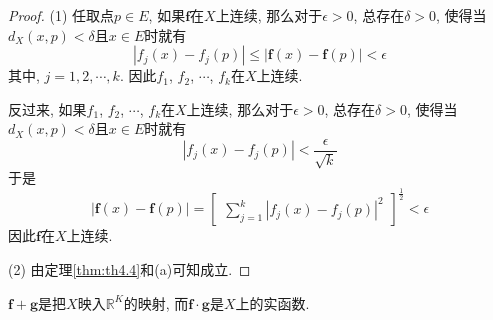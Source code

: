 \documentclass[cn,12pt,math=mtpro2,citestyle=gb7714-2015,bibstyle=gb7714-2015,twocol]{elegantbook}
\newcommand{\R}{\mathbb{R}}
\newcommand{\f}{\mathbold{f}}
\newcommand{\g}{\mathbold{g}}
\begin{document}
\begin{proof}
  (1) 任取点$p\in E$, 如果$\f $在$X$上连续, 那么对于$\epsilon>0$, 总存在$\delta>0$, 使得当$d_X(x,p)<\delta$且$x\in E$时就有
  $$|f_j(x)-f_j(p)|\leq|\f (x)-\f (p)|<\epsilon$$
  其中, $j=1,2,\cdots,k$. 因此$f_1$, $f_2$, $\cdots$, $f_k$在$X$上连续.

  反过来, 如果$f_1$, $f_2$, $\cdots$, $f_k$在$X$上连续, 那么对于$\epsilon>0$, 总存在$\delta>0$, 使得当$d_X(x,p)<\delta$且$x\in E$时就有
  $$|f_j(x)-f_j(p)|<\frac{\epsilon}{\sqrt{k}}$$
  于是
  $$|\f (x)-\f (p)|=\begin{bmatrix}
                      \displaystyle\sum_{j=1}^{k}|f_j(x)-f_j(p)|^2
                    \end{bmatrix}^{\frac{1}{2}}<\epsilon$$
  因此$\f $在$X$上连续.

  (2) 由定理\ref{thm:th4.4}和(a)可知成立.


\end{proof}
\begin{remark}
$\f +\g $是把$X$映入$\R^K$的映射, 而$\f \cdot\g $是$X$上的实函数.
\end{remark}
\end{document}
